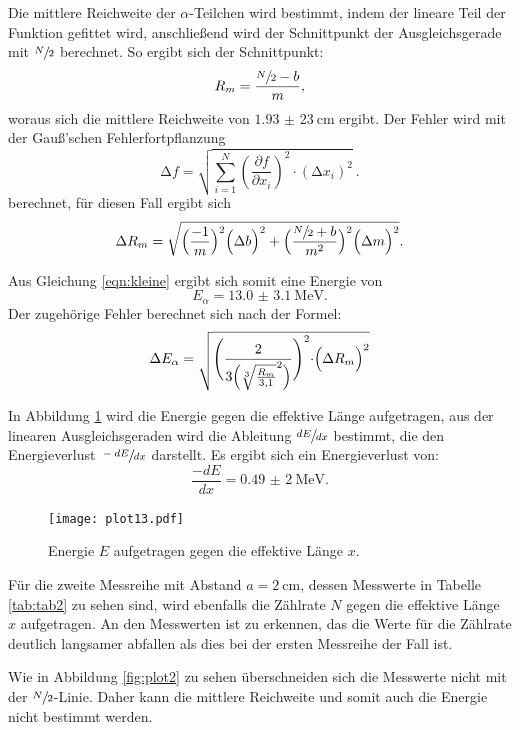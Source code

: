 Die mittlere Reichweite der $\alpha$-Teilchen wird bestimmt, indem
der lineare Teil der Funktion gefittet wird, anschließend wird der Schnittpunkt
der Ausgleichsgerade mit $\sfrac{N}{2}$ berechnet. So ergibt sich
der Schnittpunkt:
\begin{equation}
  R_m=\frac{\sfrac{N}{2}-b}{m},
  \label{eqn:mittel}
\end{equation}
woraus sich die mittlere Reichweite von $\SI{1,93(23)}{\cm}$ ergibt.
Der Fehler wird mit der Gauß'schen Fehlerfortpflanzung
\begin{equation}
  \increment f = \sqrt{ \sum_{i=1}^N \left( \frac{\partial f}{\partial x_i}\right)^2
  \cdot (\increment x_i)^2  } \: .
  \label{eqn:gaus}
\end{equation}
berechnet, für diesen Fall ergibt sich
\begin{equation}
  \Delta R_m=\sqrt{\Bigl(\frac{-1}{m}\Bigr)^2 \Bigl(\Delta b\Bigr)^2+ \Bigl(\frac{\sfrac{N}{2}+b}{m^2}\Bigr)^2
  \Bigl(\Delta m\Bigr)^2}.
\end{equation}

Aus Gleichung \ref{eqn:kleine} ergibt sich somit eine Energie von
\begin{equation*}
  E_{\alpha}=\SI{13.0(31)}{\MeV}.
\end{equation*}
Der zugehörige Fehler berechnet sich nach der Formel:
\begin{equation}
  \Delta E_{\alpha}=\sqrt{\Biggl(\frac{2}{3\Bigl(\sqrt[3]{\frac{R_m}{3,1}}^2\Bigr)}\Biggl)^2\cdot \Bigl(\Delta R_m\Bigr)^2}
\end{equation}

In Abbildung \ref{fig:plot13} wird die Energie gegen die effektive Länge aufgetragen,
aus der linearen Ausgleichsgeraden wird die Ableitung $\sfrac{dE}{dx}$ bestimmt, die
den Energieverlust $\sfrac{-dE}{dx}$ darstellt.
Es ergibt sich ein Energieverlust von:
\begin{equation*}
  \frac{-dE}{dx}=\SI{0,49(2)}{\MeV}.
\end{equation*}

\begin{figure}
  \centering
  \texttt{[image: plot13.pdf]}
  \caption{Energie $E$ aufgetragen gegen die effektive Länge $x$.}
  \label{fig:plot13}
\end{figure}

Für die zweite Messreihe mit Abstand $a=\SI{2}{\cm}$, dessen Messwerte in Tabelle \ref{tab:tab2} zu
sehen sind, wird ebenfalls die Zählrate $N$ gegen die effektive Länge $x$ aufgetragen.
An den Messwerten ist zu erkennen, das die Werte für die Zählrate deutlich langsamer
abfallen als dies bei der ersten Messreihe der Fall ist.

Wie in Abbildung \ref{fig:plot2} zu sehen überschneiden sich die Messwerte nicht mit
der $\sfrac{N}{2}$-Linie. Daher kann die mittlere Reichweite und somit auch
die Energie nicht bestimmt werden.

